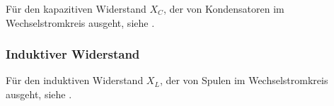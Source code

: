 Für den kapazitiven Widerstand $X_C$, der von Kondensatoren im Wechselstromkreis ausgeht, siehe .


\subsubsection{Induktiver Widerstand}

Für den induktiven Widerstand $X_L$, der von Spulen im Wechselstromkreis ausgeht, siehe .






